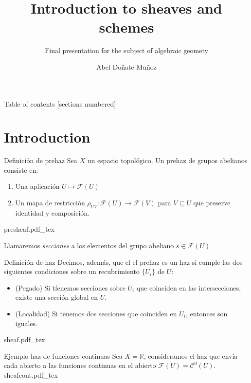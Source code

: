 \documentclass[10pt]{beamer}
\title{Introduction to sheaves and schemes}
\subtitle{Final presentation for the subject of algebraic geomety}
\date{}
\author{Abel Doñate Muñoz}
\institute{Universitat Politècnica de Catalunya}
\newcommand{\incfig}[1]{%
\center
\def\svgwidth{0.9\columnwidth}
{#1.pdf_tex}
}
\begin{document}
\maketitle

\begin{frame}{Table of contents}
  [sections numbered]
  \tableofcontents%
\end{frame}

\section[Intro]{Introduction}

\begin{frame}[fragile]{Definición de prehaz}
Sea $X$ un espacio topológico. Un prehaz de grupos abelianos consiste en:
\begin{enumerate}
  \item Una aplicación $U \mapsto \mathcal{F}(U)$
  \item Un mapa de restricción $\rho_{UV}: \mathcal{F}(U) \to \mathcal{F}(V)$ para $ V \subseteq U$ que preserve identidad y composición.
\end{enumerate} 

\incfig{presheaf}

Llamaremos \textit{secciones} a los elementos del grupo abeliano $s \in \mathcal{F}(U) $ 

\end{frame}


\begin{frame}[fragile]{Definición de haz}
Decimos, además, que el el prehaz es un haz si cumple las dos siguientes condiciones sobre un recubrimiento $\{U_i\}$ de $U$:
\begin{itemize}
  \item (Pegado) Si tfenemos secciones sobre $U_i$ que coinciden en las intersecciones, existe una sección global en $U$.
  \item (Localidad) Si tenemos dos secciones que coinciden en $U_i$, entonces son iguales.
\end{itemize}

\incfig{sheaf}

\end{frame}


\begin{frame}[fragile]{Ejemplo haz de funciones continuas}
Sea $X = \mathbb{R}$, consideramos el haz que envía cada abierto a las funciones continuas en el abierto $\mathcal{F}(U) = \mathcal{C}^0(U)$.
\incfig{sheafcont}
\end{frame}
\end{document}
